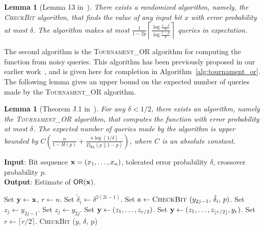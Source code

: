 \documentclass[journal, onecolumn]{IEEEtran}
\theoremstyle{plain}
\newtheorem{lemma}[theorem]{Lemma}
\theoremstyle{definition}
\theoremstyle{remark}
\def\DKL{{D_\mathsf{KL}(p\|1-p)}}
\newcommand{\scb}{\textsc{CheckBit }}
\newcommand{\stouror}{\textsc{Tournament\_OR }}
\begin{document}
\begin{lemma}[Lemma 13 in~\citep{Gu-Xu2023}] \label{lemma:check-bit}
    There exists a randomized algorithm, namely, the \scb{} algorithm, that finds the value of any input bit $x$ with error probability at most $\delta$. The algorithm makes at most 
       $ \frac{1}{1-2p}\left\lceil\frac{\log\frac{1-\delta}{\delta}}{\log\frac{1-p}{p}}\right\rceil$
    queries in expectation.
\end{lemma}

The second algorithm is the \stouror algorithm for computing the \orn function from noisy queries. This algorithm has been previously proposed in our earlier work~\citep{zhu2023optimal}, and is given here for completion in Algorithm~\ref{alg:tournament_or}. The following lemma gives an upper bound on the expected number of queries made by the \stouror algorithm.


\begin{lemma}[Theorem J.1 in~\citep{zhu2023optimal}] \label{lemma:tournament-or}
    For any $\delta<1/2$, there exists an algorithm, namely the \stouror algorithm, that computes the \orn function with error probability at most $\delta$. The expected number of queries made by the algorithm is upper bounded by $C\left(\frac{n}{1-H(p)}+\frac{n\log(1/\delta)}{\DKL}\right)$, where $C$ is an absolute constant.
\end{lemma}

\begin{algorithm}[t]%
    \caption{\stouror algorithm for computing noisy \orn function}
    \label{alg:tournament_or}
    \textbf{Input}: Bit sequence ${\bf x} = (x_1,\ldots,x_n)$, tolerated error probability $\delta$, crossover probability $p$.\\
    \textbf{Output}: Estimate of $\mathsf{OR}({\bf x})$.
    \begin{algorithmic}[1]
        \State Set ${\bf y} \gets {\bf x}$, $r\gets n$.
            \State Set $\tilde\delta_i \gets \delta^{2(2i-1)}$.
                \State Set $a \gets \scb(y_{2j-1}, \, \tilde\delta_i, \, p)$.
                    \State Set $z_j \gets y_{2j-1}$.
                \Else
                    \State Set $z_j \gets y_{2j}$.
                \EndIf
            \EndFor
                \State Set ${\bf y} \gets (z_1, \ldots, z_{r/2})$.
            \Else
                \State Set ${\bf y} \gets (z_1, \ldots, z_{\lfloor r/2\rfloor}, y_r)$.
            \EndIf
            \State Set $r\gets \lceil r/2 \rceil$.
        \EndFor
        \State \Return \scb($y$, $\delta$, p)
    \end{algorithmic}
\end{algorithm}
\end{document}
